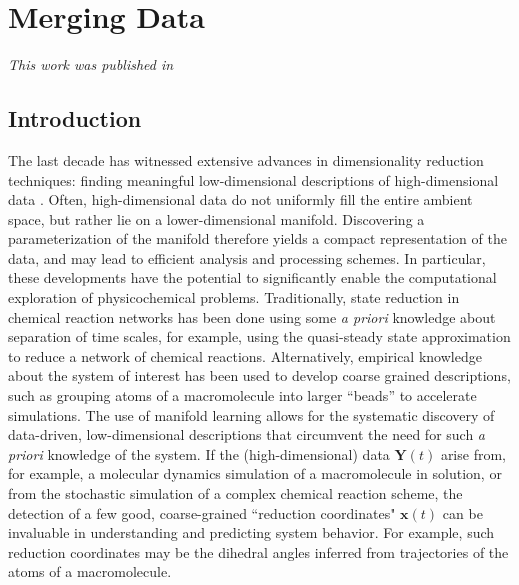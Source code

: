 \chapter{Merging Data\label{ch:merging}}

\graphicspath{{ch-merging/figures/}}

{\em This work was published in \citep{dsilva2013nonlinear}}

\section{Introduction}
The last decade has witnessed extensive advances in dimensionality reduction techniques:
finding meaningful low-dimensional descriptions of high-dimensional data \cite{tenenbaum2000global,roweis2000nonlinear,Donoho2003,Belkin2003,Coifman2006}.
%
Often, high-dimensional data do not uniformly fill the entire ambient space, but rather lie on a lower-dimensional manifold.
%
Discovering a parameterization of the manifold therefore yields a compact representation of the data, and may lead to efficient analysis and processing schemes.
%
In particular, these developments have the potential to significantly enable the computational exploration
of physicochemical problems.
%
Traditionally, state reduction in chemical reaction networks has been done using some {\em a priori} knowledge about separation of time scales,
for example, using the quasi-steady state approximation to reduce a network of chemical reactions\cite{bowen1963singular}.
%
Alternatively, empirical knowledge about the system of interest has been used to develop coarse grained descriptions,
such as grouping atoms of a macromolecule into larger ``beads'' to accelerate simulations\cite{monticelli2008martini, spiga2013electrostatic,izvekov2005systematic, saunders2013coarse}.
%
The use of manifold learning allows for the systematic discovery of data-driven, low-dimensional descriptions that circumvent the need for such {\em a priori} knowledge of the system.
%
If the (high-dimensional) data $\mathbf{Y}(t)$ arise from, for example, a
molecular dynamics simulation of a macromolecule in solution, or from the stochastic
simulation of a complex chemical reaction scheme, the detection of a few good, coarse-grained
``reduction coordinates" $\mathbf{x}(t)$ can be invaluable in understanding and predicting system behavior.
%
For example, such reduction coordinates may be the dihedral angles inferred from trajectories of the atoms of a macromolecule.

